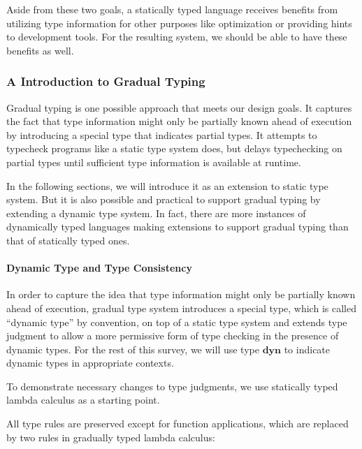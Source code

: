Aside from these two goals,
a statically typed language receives benefits from
utilizing type information for other purposes like
optimization or providing hints to development tools.
For the resulting system, we should be able to have these benefits as well.

\subsubsection{A Introduction to Gradual Typing}

\newcommand{\dyn}{\textbf{dyn}}

Gradual typing \cite{siek2006gradual} is one possible approach that meets our design goals.
It captures the fact that type information might only be partially known
ahead of execution by introducing a special type that indicates partial types.
It attempts to typecheck programs like a static type system does, but delays
typechecking on partial types until sufficient type information is available
at runtime.

In the following sections, we will introduce it
as an extension to static type system.
But it is also possible and practical to support gradual typing by
extending a dynamic type system.
In fact, there are more instances of dynamically typed languages
making extensions to support gradual typing than that of statically typed ones.

\paragraph{Dynamic Type and Type Consistency}

In order to capture the idea that type information might only be partially known
ahead of execution, gradual type system introduces a special type, 
which is called ``dynamic type'' by convention, on top of a static type system
and extends type judgment to allow a more permissive form of type checking in the presence
of dynamic types. For the rest of this survey,
we will use type $\dyn$ to indicate dynamic types in appropriate contexts.

To demonstrate necessary changes to type judgments,
we use statically typed lambda calculus as a starting point.

All type rules are preserved except for function applications,
which are replaced by two rules in gradually typed lambda calculus:


